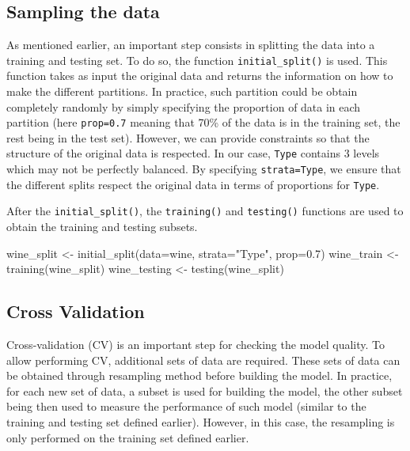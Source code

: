 \documentclass[
]{krantz}
\makeatletter
\newenvironment{Shaded}{\begin{snugshade}}{\end{snugshade}}
\newcommand{\AttributeTok}[1]{\textcolor[rgb]{0.61,0.61,0.61}{#1}}
\newcommand{\FloatTok}[1]{\textcolor[rgb]{0.06,0.06,0.06}{#1}}
\newcommand{\FunctionTok}[1]{\textcolor[rgb]{0,0,0}{#1}}
\newcommand{\NormalTok}[1]{#1}
\newcommand{\OtherTok}[1]{\textcolor[rgb]{0.37,0.37,0.37}{#1}}
\newcommand{\StringTok}[1]{\textcolor[rgb]{0.5,0.5,0.5}{#1}}
\newenvironment{kframe}{%
\medskip{}
\setlength{\fboxsep}{.8em}
 \def\at@end@of@kframe{}%
 \ifinner\ifhmode%
  \def\at@end@of@kframe{\end{minipage}}%
  \begin{minipage}{\columnwidth}%
 \fi\fi%
 \def\FrameCommand##1{\hskip\@totalleftmargin \hskip-\fboxsep
 \colorbox{shadecolor}{##1}\hskip-\fboxsep
     \hskip-\linewidth \hskip-\@totalleftmargin \hskip\columnwidth}%
 \MakeFramed {\advance\hsize-\width
   \@totalleftmargin\z@ \linewidth\hsize
   \@setminipage}}%
 {\par\unskip\endMakeFramed%
 \at@end@of@kframe}
\renewenvironment{Shaded}{\begin{kframe}}{\end{kframe}}
\makeatother
\begin{document}
\hypertarget{sampling-the-data}{%
\subsection{Sampling the data}\label{sampling-the-data}}

As mentioned earlier, an important step consists in splitting the data into a training and testing set. To do so, the function \texttt{initial\_split()} is used. This function takes as input the original data and returns the information on how to make the different partitions. In practice, such partition could be obtain completely randomly by simply specifying the proportion of data in each partition (here \texttt{prop=0.7} meaning that 70\% of the data is in the training set, the rest being in the test set). However, we can provide constraints so that the structure of the original data is respected. In our case, \texttt{Type} contains 3 levels which may not be perfectly balanced. By specifying \texttt{strata=Type}, we ensure that the different splits respect the original data in terms of proportions for \texttt{Type}.

After the \texttt{initial\_split()}, the \texttt{training()} and \texttt{testing()} functions are used to obtain the training and testing subsets.

\begin{Shaded}
\begin{Highlighting}[]
\NormalTok{wine\_split }\OtherTok{\textless{}{-}} \FunctionTok{initial\_split}\NormalTok{(}\AttributeTok{data=}\NormalTok{wine, }\AttributeTok{strata=}\StringTok{"Type"}\NormalTok{, }\AttributeTok{prop=}\FloatTok{0.7}\NormalTok{)}
\NormalTok{wine\_train }\OtherTok{\textless{}{-}} \FunctionTok{training}\NormalTok{(wine\_split)}
\NormalTok{wine\_testing }\OtherTok{\textless{}{-}} \FunctionTok{testing}\NormalTok{(wine\_split)}
\end{Highlighting}
\end{Shaded}

\hypertarget{cross-validation}{%
\subsection{Cross Validation}\label{cross-validation}}

Cross-validation (CV) is an important step for checking the model quality. To allow performing CV, additional sets of data are required. These sets of data can be obtained through resampling method before building the model. In practice, for each new set of data, a subset is used for building the model, the other subset being then used to measure the performance of such model (similar to the training and testing set defined earlier). However, in this case, the resampling is only performed on the training set defined earlier.
\end{document}
